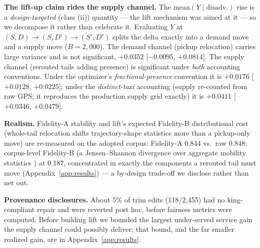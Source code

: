 \textbf{The lift-up claim rides the supply channel.} The
$\mathrm{mean}(Y \mid \mathrm{disadv.})$ rise is a
\emph{design-targeted} (class (ii)) quantity --- the lift mechanism was aimed at it --- so
we decompose it rather than celebrate it. Evaluating $Y$ at
$(S,D) \to (S,D') \to (S',D')$ splits the delta exactly into a demand move and
a supply move ($B{=}2{,}000$). The demand channel (pickup relocation) carries
large variance and is not significant, $+0.0352$ [$-0.0095$, $+0.0814$]. The
supply channel (rerouted tails adding presence) is significant under
\emph{both} accounting conventions. Under the optimizer's
\emph{fractional-presence} convention it is $+0.0176$ [$+0.0128$, $+0.0225$]; %
under the \emph{distinct-taxi} accounting (supply re-counted from raw GPS;
it reproduces the production supply grid exactly) it is $+0.0411$
[$+0.0346$, $+0.0479$].

\textbf{Realism.} Fidelity-A stability and lift's expected Fidelity-B
distributional cost (whole-tail relocation shifts trajectory-shape statistics
more than a pickup-only move) are re-measured on the adopted corpus:
Fidelity-A 0.844 vs.\ raw 0.848; corpus-level Fidelity-B (a Jensen--Shannon
divergence over aggregate mobility statistics \cite{feng2020simulate}) at
0.187, concentrated in exactly the components a rerouted tail must move
(Appendix~\ref{app:results}) --- a by-design trade-off we disclose rather than
net out.

\textbf{Provenance disclosures.} About 5\% of trim edits (118/2{,}455) had no
king-compliant repair and were reverted post hoc, before fairness metrics were 
computed. Before building lift we bounded the largest under-served service
gain the supply channel could possibly deliver; that bound, and the far
smaller realized gain, are in Appendix~\ref{app:results}.

